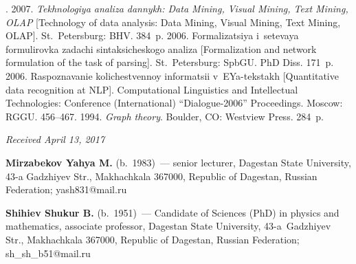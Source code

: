   \begin{multicols}{2}

\renewcommand{\bibname}{\protect\rmfamily References}

{\small\frenchspacing
 {%
 \begin{thebibliography}{9}
     
    
. 
2007. \textit{Tekhnologiya analiza dannykh: Data Mining, Visual Mining, Text 
Mining, OLAP} [Technology of data analysis: Data Mining, Visual Mining, Text 
Mining, OLAP]. St.\ Petersburg: BHV. 384~p.
 2006. Formalizatsiya i~setevaya formulirovka zadachi 
sintaksicheskogo analiza [Formalization and network formulation of the task of 
parsing].  
St.\ Petersburg: SpbGU. PhD Diss. 171~p.
 2006. Ras\-po\-zna\-va\-nie kolichestvennoy 
informatsii v~EYa-tekstakh [Quantitative data recognition at NLP]. Computational 
Linguistics and Intellectual Technologies: Conference (International) ``Dialogue-2006'' 
Proceedings. Moscow: RGGU. 456--467.
 1994. \textit{Graph theory}. Boulder, CO: Westview Press. 284~p.
\end{thebibliography}

 }
 }

\end{multicols}

\vspace*{-3pt}

\hfill{\small\textit{Received April 13, 2017}}



      \Contr
      
      \noindent
     \textbf{Mirzabekov Yahya M.} (b.\ 1983)~--- senior lecturer, Dagestan State 
University, 43-a Gadzhiyev Str., Makhachkala 367000, Republic of Dagestan, Russian 
Federation; \mbox{yash831@mail.ru}
      
      \vspace*{3pt}
      
      \noindent
      \textbf{Shihiev Shukur B.} (b.\ 1951)~--- Candidate of Sciences (PhD) in physics 
and mathematics, associate professor, Dagestan State University, 43-a~Gadzhiyev Str., 
Makhachkala 367000, Republic of Dagestan, Russian Federation; 
\mbox{sh\_sh\_b51@mail.ru}
\label{end\stat}


\renewcommand{\bibname}{\protect\rm Литература} 